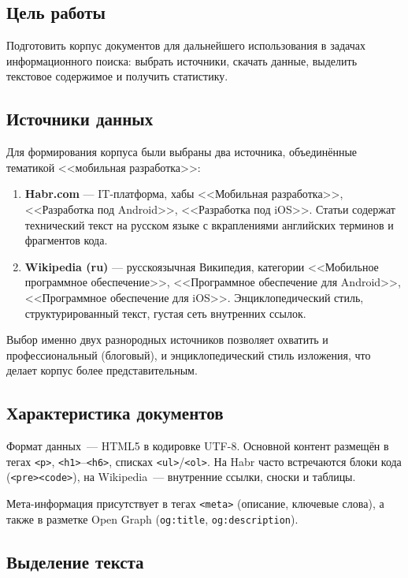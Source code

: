 \documentclass[12pt,a4paper]{article}
\begin{document}
\subsection{Цель работы}

Подготовить корпус документов для дальнейшего использования в задачах информационного поиска: выбрать источники, скачать данные, выделить текстовое содержимое и получить статистику.

\subsection{Источники данных}

Для формирования корпуса были выбраны два источника, объединённые тематикой <<мобильная разработка>>:

\begin{enumerate}
    \item \textbf{Habr.com} --- IT-платформа, хабы <<Мобильная разработка>>, <<Разработка под Android>>, <<Разработка под iOS>>. Статьи содержат технический текст на русском языке с вкраплениями английских терминов и фрагментов кода.

    \item \textbf{Wikipedia (ru)} --- русскоязычная Википедия, категории <<Мобильное программное обеспечение>>, <<Программное обеспечение для Android>>, <<Программное обеспечение для iOS>>. Энциклопедический стиль, структурированный текст, густая сеть внутренних ссылок.
\end{enumerate}

Выбор именно двух разнородных источников позволяет охватить и профессиональный (блоговый), и энциклопедический стиль изложения, что делает корпус более представительным.

\subsection{Характеристика документов}

Формат данных~--- HTML5 в кодировке UTF-8. Основной контент размещён в тегах \texttt{<p>}, \texttt{<h1>}--\texttt{<h6>}, списках \texttt{<ul>}/\texttt{<ol>}. На Habr часто встречаются блоки кода (\texttt{<pre><code>}), на Wikipedia~--- внутренние ссылки, сноски и таблицы.

Мета-информация присутствует в тегах \texttt{<meta>} (описание, ключевые слова), а также в разметке Open Graph (\texttt{og:title}, \texttt{og:description}).

\subsection{Выделение текста}
\end{document}
